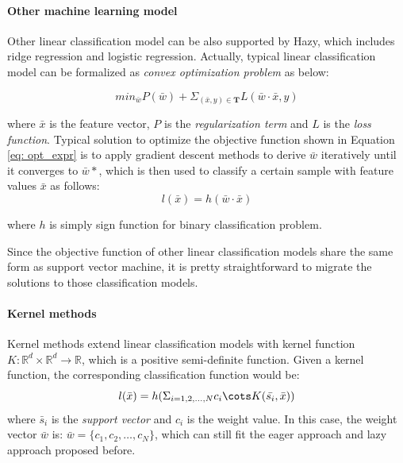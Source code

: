 \paragraph{Other machine learning model}
Other linear classification model can be also supported by Hazy, which includes ridge regression and logistic regression. Actually, typical linear classification model can be formalized as {\em convex optimization problem} as below:

\begin{equation}\label{eq: opt_expr}
    min_{\bar{w}}P(\bar{w}) + \Sigma_{(\bar{x},y) \in \textbf{T}}L(\bar{w}\cdot\bar{x}, y)
\end{equation}

where $\bar{x}$ is the feature vector, $P$ is the {\em regularization term} and $L$ is the {\em loss function}. Typical solution to optimize the objective function shown in Equation \ref{eq: opt_expr} is to apply gradient descent methods to derive $\bar{w}$ iteratively until it converges to $\bar{w}*$, which is then used to classify a certain sample with feature values $\bar{x}$ as follows:
\begin{equation}
    l(\bar{x}) = h(\bar{w}\cdot\bar{x})
\end{equation}

where $h$ is simply sign function for binary classification problem.

Since the objective function of other linear classification models share the same form as support vector machine, it is pretty straightforward to migrate the solutions to those classification models.

\paragraph{Kernel methods}
Kernel methods extend linear classification models with kernel function $K: \mathbb{R}^d \times \mathbb{R}^d \rightarrow \mathbb{R}$, which is a positive semi-definite function. Given a kernel function, the corresponding classification function would be:
\begin{equation}\label{eq: kernel classification}
    l(\bar{x})=h(\Sigma_{i=1,2,\dots,N}c_i\cots K(\bar{s_i}, \bar{x}))
\end{equation}
where $\bar{s}_i$ is the {\em support vector} and $c_i$ is the weight value. In this case, the weight vector $\bar{w}$ is: $\bar{w} = \{c_1, c_2,\dots, c_N\}$, which can still fit the eager approach and lazy approach proposed before.

